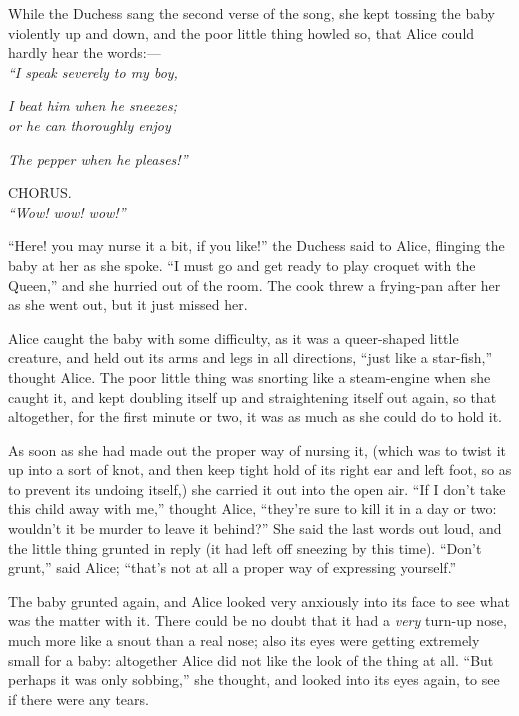 \documentclass[book, 20pt]{extbook}
\begin{document}
While the Duchess sang the second verse of the song, she kept tossing
the baby violently up and down, and the poor little thing howled so,
that Alice could hardly hear the words:---\\
\bigskip
\noindent\emph{``I speak severely to my boy,}

\emph{I beat him when he sneezes;\\}
\noindent\emph{or he can thoroughly enjoy}

\emph{The pepper when he pleases!''}

\begin{center}
CHORUS.\\

\center\emph{``Wow! wow! wow!''}
\end{center}

``Here! you may nurse it a bit, if you like!'' the Duchess said to
Alice, flinging the baby at her as she spoke. ``I must go and get ready
to play croquet with the Queen,'' and she hurried out of the room. The
cook threw a frying-pan after her as she went out, but it just missed
her.

Alice caught the baby with some difficulty, as it was a queer-shaped
little creature, and held out its arms and legs in all directions,
``just like a star-fish,'' thought Alice. The poor little thing was
snorting like a steam-engine when she caught it, and kept doubling
itself up and straightening itself out again, so that altogether, for
the first minute or two, it was as much as she could do to hold it.

As soon as she had made out the proper way of nursing it, (which was to
twist it up into a sort of knot, and then keep tight hold of its right
ear and left foot, so as to prevent its undoing itself,) she carried it
out into the open air. ``If I don't take this child away with me,''
thought Alice, ``they're sure to kill it in a day or two: wouldn't it be
murder to leave it behind?'' She said the last words out loud, and the
little thing grunted in reply (it had left off sneezing by this time).
``Don't grunt,'' said Alice; ``that's not at all a proper way of
expressing yourself.''

The baby grunted again, and Alice looked very anxiously into its face to
see what was the matter with it. There could be no doubt that it had a
\emph{very} turn-up nose, much more like a snout than a real nose; also
its eyes were getting extremely small for a baby: altogether Alice did
not like the look of the thing at all. ``But perhaps it was only
sobbing,'' she thought, and looked into its eyes again, to see if there
were any tears.
\end{document}
